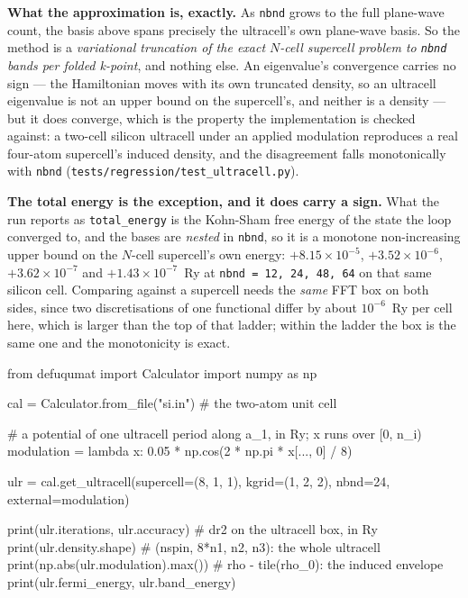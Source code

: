 \documentclass[11pt,a4paper]{article}
\newcommand{\code}[1]{\texttt{\small #1}}
\begin{document}
\textbf{What the approximation is, exactly.} As \code{nbnd} grows to the full
plane-wave count, the basis above spans precisely the ultracell's own
plane-wave basis. So the method is a \emph{variational truncation of the exact
$N$-cell supercell problem to \code{nbnd} bands per folded k-point}, and
nothing else. An eigenvalue's convergence carries no sign --- the Hamiltonian
moves with its own truncated density, so an ultracell eigenvalue is not an
upper bound on the supercell's, and neither is a density --- but it does
converge, which is the property the implementation is checked against: a
two-cell silicon ultracell under an applied modulation reproduces a real
four-atom supercell's induced density, and the disagreement falls monotonically
with \code{nbnd} (\code{tests/regression/test\_ultracell.py}).

\textbf{The total energy is the exception, and it does carry a sign.} What the
run reports as \code{total\_energy} is the Kohn-Sham free energy of the state
the loop converged to, and the bases are \emph{nested} in \code{nbnd}, so it is
a monotone non-increasing upper bound on the $N$-cell supercell's own energy:
$+8.15\times10^{-5}$, $+3.52\times10^{-6}$, $+3.62\times10^{-7}$ and
$+1.43\times10^{-7}$~Ry at \code{nbnd = 12, 24, 48, 64} on that same silicon
cell. Comparing against a supercell needs the \emph{same} FFT box on both
sides, since two discretisations of one functional differ by about
$10^{-6}$~Ry per cell here, which is larger than the top of that ladder; within
the ladder the box is the same one and the monotonicity is exact.

\begin{pycode}
from defuqumat import Calculator
import numpy as np

cal = Calculator.from_file("si.in")        # the two-atom unit cell

# a potential of one ultracell period along a_1, in Ry; x runs over [0, n_i)
modulation = lambda x: 0.05 * np.cos(2 * np.pi * x[..., 0] / 8)

ulr = cal.get_ultracell(supercell=(8, 1, 1), kgrid=(1, 2, 2),
                        nbnd=24, external=modulation)

print(ulr.iterations, ulr.accuracy)    # dr2 on the ultracell box, in Ry
print(ulr.density.shape)               # (nspin, 8*n1, n2, n3): the whole ultracell
print(np.abs(ulr.modulation).max())    # rho - tile(rho_0): the induced envelope
print(ulr.fermi_energy, ulr.band_energy)
\end{pycode}
\end{document}
